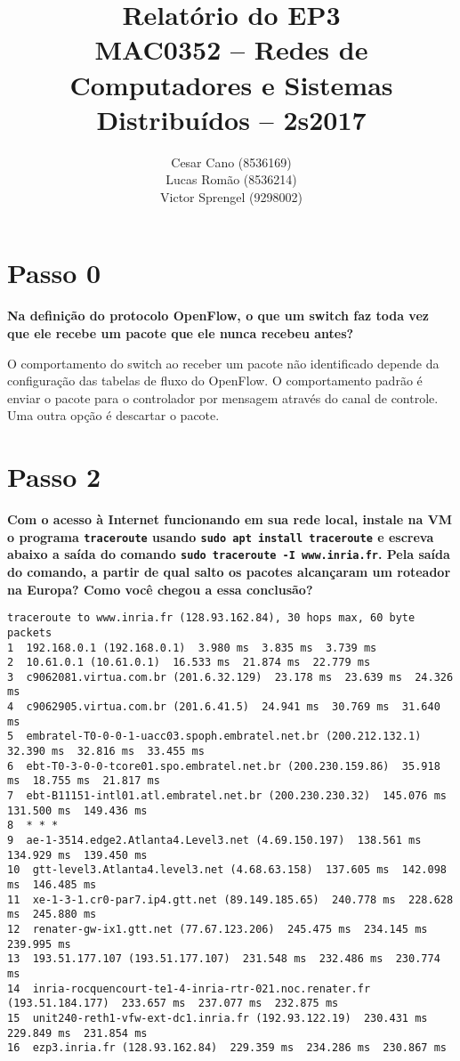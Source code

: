 \documentclass[12pt,letterpaper]{article}
\title{Relatório do EP3\\MAC0352 -- Redes de Computadores e Sistemas Distribuídos -- 2s2017}
\author{Cesar Cano (8536169) \\ Lucas Romão (8536214) \\ Victor Sprengel (9298002)}
\date{}
\begin{document}
\maketitle

\section{Passo 0}

\textbf{Na definição do protocolo OpenFlow, o que um switch faz toda
vez que ele recebe um pacote que ele nunca recebeu antes?}

O comportamento do switch ao receber um pacote não identificado depende da configuração
das tabelas de fluxo do OpenFlow. O comportamento padrão é enviar o pacote para o controlador
por mensagem através do canal de controle. Uma outra opção é descartar o pacote.

\section{Passo 2}

\textbf{Com o acesso à Internet funcionando em sua rede local, instale
na VM o programa \texttt{traceroute} usando \texttt{sudo apt install
traceroute} e escreva abaixo a saída do comando \texttt{sudo
traceroute -I www.inria.fr}. Pela saída do comando, a partir de qual
salto os pacotes alcançaram um roteador na Europa? Como você chegou a
essa conclusão?} 

\begin{verbatim}
traceroute to www.inria.fr (128.93.162.84), 30 hops max, 60 byte packets
1  192.168.0.1 (192.168.0.1)  3.980 ms  3.835 ms  3.739 ms
2  10.61.0.1 (10.61.0.1)  16.533 ms  21.874 ms  22.779 ms
3  c9062081.virtua.com.br (201.6.32.129)  23.178 ms  23.639 ms  24.326 ms
4  c9062905.virtua.com.br (201.6.41.5)  24.941 ms  30.769 ms  31.640 ms
5  embratel-T0-0-0-1-uacc03.spoph.embratel.net.br (200.212.132.1)  32.390 ms  32.816 ms  33.455 ms
6  ebt-T0-3-0-0-tcore01.spo.embratel.net.br (200.230.159.86)  35.918 ms  18.755 ms  21.817 ms
7  ebt-B11151-intl01.atl.embratel.net.br (200.230.230.32)  145.076 ms  131.500 ms  149.436 ms
8  * * *
9  ae-1-3514.edge2.Atlanta4.Level3.net (4.69.150.197)  138.561 ms  134.929 ms  139.450 ms
10  gtt-level3.Atlanta4.level3.net (4.68.63.158)  137.605 ms  142.098 ms  146.485 ms
11  xe-1-3-1.cr0-par7.ip4.gtt.net (89.149.185.65)  240.778 ms  228.628 ms  245.880 ms
12  renater-gw-ix1.gtt.net (77.67.123.206)  245.475 ms  234.145 ms  239.995 ms
13  193.51.177.107 (193.51.177.107)  231.548 ms  232.486 ms  230.774 ms
14  inria-rocquencourt-te1-4-inria-rtr-021.noc.renater.fr (193.51.184.177)  233.657 ms  237.077 ms  232.875 ms
15  unit240-reth1-vfw-ext-dc1.inria.fr (192.93.122.19)  230.431 ms  229.849 ms  231.854 ms
16  ezp3.inria.fr (128.93.162.84)  229.359 ms  234.286 ms  230.867 ms
\end{verbatim}
\end{document}
